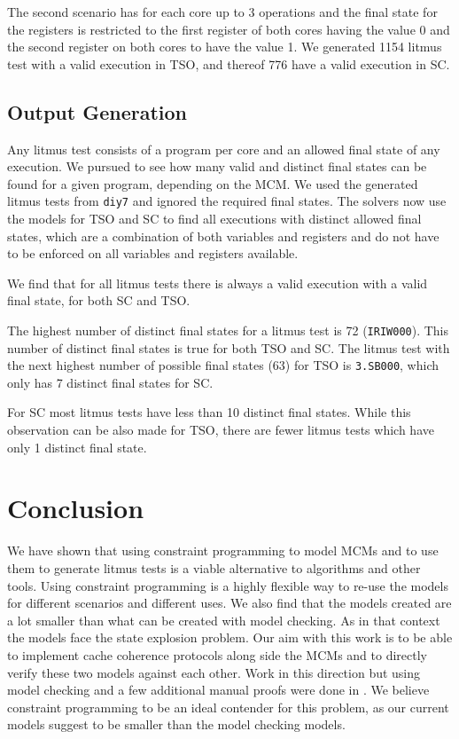 \documentclass[runningheads]{llncs}
\begin{document}
The second scenario has for each core up to 3 operations and the final state for the registers is restricted to the first register of both cores having the value 0 and the second register on both cores to have the value 1.
We generated 1154 litmus test with a valid execution in TSO, and thereof 776 have a valid execution in SC.

\subsection{Output Generation}
Any litmus test consists of a program per core and an allowed final state of any execution.
We pursued to see how many valid and distinct final states can be found for a given program, depending on the MCM.
We used the generated litmus tests from {\tt{diy7}} and ignored the required final states.
The solvers now use the models for TSO and SC to find all executions with distinct allowed final states, which are a combination of both variables and registers and do not have to be enforced on all variables and registers available.

We find that for all litmus tests there is always a valid execution with a valid final state, for both SC and TSO.

The highest number of distinct final states for a litmus test is 72 ({\tt{IRIW000}}).
This number of distinct final states is true for both TSO and SC.
The litmus test with the next highest number of possible final states (63) for TSO is {\tt{3.SB000}}, which only has 7 distinct final states for SC.

For SC most litmus tests have less than 10 distinct final states.
While this observation can be also made for TSO, there are fewer litmus tests which have only 1 distinct final state.

\section{Conclusion}
We have shown that using constraint programming to model MCMs and to use them to generate litmus tests is a viable alternative to algorithms and other tools.
Using constraint programming is a highly flexible way to re-use the models for different scenarios and different uses.
We also find that the models created are a lot smaller than what can be created with model checking. As in that context the models face the state explosion problem.
Our aim with this work is to be able to implement cache coherence protocols along side the MCMs and to directly verify these two models against each other.
Work in this direction but using model checking and a few additional manual proofs were done in \cite{banks2017verification}.
We believe constraint programming to be an ideal contender for this problem, as our current models suggest to be smaller than the model checking models.



\end{document}
